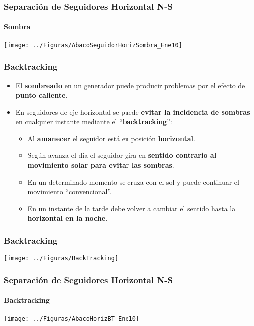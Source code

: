 \documentclass[xcolor=dvipsnames]{beamer}
\begin{document}
\begin{frame}
\frametitle{Separación de Seguidores Horizontal N-S}


\framesubtitle{Sombra}

\begin{center}
\texttt{[image: ../Figuras/AbacoSeguidorHorizSombra\_Ene10]}
\par\end{center}


\end{frame}

\begin{frame}
\frametitle{Backtracking}
\begin{itemize}
\item El \textbf{sombreado} en un generador puede producir problemas por
el efecto de \textbf{punto caliente}.
\item En seguidores de eje horizontal se puede \textbf{evitar la incidencia
de sombras} en cualquier instante mediante el {}``\textbf{backtracking}'':

\begin{itemize}
\item Al \textbf{amanecer} el seguidor está en posición \textbf{horizontal}.
\item Según avanza el día el seguidor gira en \textbf{sentido contrario
al movimiento solar para evitar las sombras}.
\item En un determinado momento se cruza con el sol y puede continuar el
movimiento {}``convencional''.
\item En un instante de la tarde debe volver a cambiar el sentido hasta
la \textbf{horizontal en la noche}.
\end{itemize}
\end{itemize}

\end{frame}

\begin{frame}
\frametitle{Backtracking}

\begin{center}
\texttt{[image: ../Figuras/BackTracking]}
\par\end{center}


\end{frame}

\begin{frame}
\frametitle{Separación de Seguidores Horizontal N-S}


\framesubtitle{Backtracking}

\begin{center}
\texttt{[image: ../Figuras/AbacoHorizBT\_Ene10]}
\par\end{center}


\end{frame}
\end{document}
